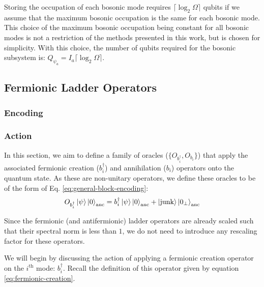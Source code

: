 Storing the occupation of each bosonic mode requires $\lceil \log_2{\Omega} \rceil$ qubits if we assume that the maximum bosonic occupation is the same for each bosonic mode.
This choice of the maximum bosonic occupation being constant for all bosonic modes is not a restriction of the methods presented in this work, but is chosen for simplicity. 
With this choice, the number of qubits required for the bosonic subsystem is: $Q_{\psi_a} = I_a \lceil \log_2{\Omega} \rceil$.

\subsection{Fermionic Ladder Operators}

\subsubsection{Encoding}

\subsubsection{Action}


In this section, we aim to define a family of oracles ($\{O_{b^\dagger_i}, O_{b_i}\}$) that apply the associated fermionic creation ($b_i^\dagger$) and annihilation ($b_i$) operators onto the quantum state.
As these are non-unitary operators, we define these oracles to be of the form of Eq. \ref{eq:general-block-encoding}:
\begin{equation}
    O_{b^\dagger_i} \ket{\psi} \ket{0}_\text{anc} = b^\dagger_i \ket{\psi}\ket{0}_\text{anc} + \ket{\text{junk}}\ket{0_\perp}_\text{anc}
\end{equation}

Since the fermionic (and antifermionic) ladder operators are already scaled such that their spectral norm is less than $1$, we do not need to introduce any rescaling factor for these operators.

We will begin by discussing the action of applying a fermionic creation operator on the $i^\text{th}$ mode: $b_i^\dagger$.
Recall the definition of this operator given by equation \ref{eq:fermionic-creation}.


